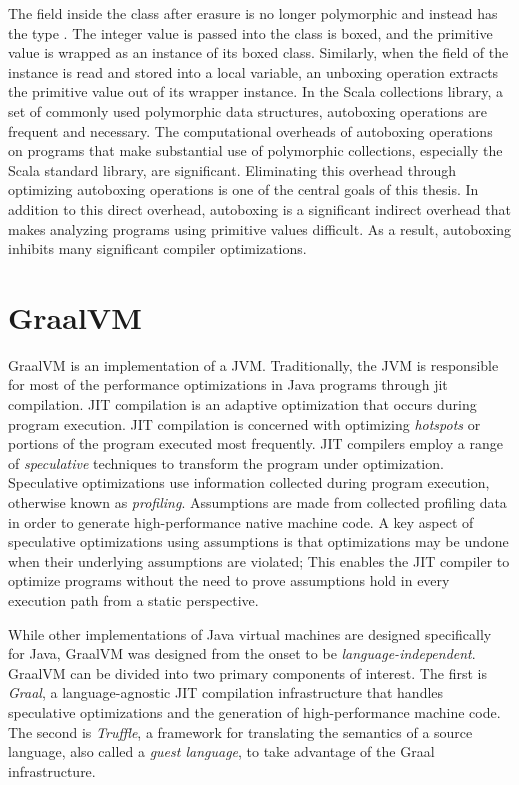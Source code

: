 The  field inside the  class after erasure is no longer polymorphic and instead has the type . 
The integer value  is passed into the  class is boxed, and the primitive value is wrapped as an instance of its boxed class.
Similarly, when the  field of the instance is read and stored into a local variable, an unboxing operation extracts the primitive value out of its wrapper instance.
In the Scala collections library, a set of commonly used polymorphic data structures, autoboxing operations are frequent and necessary.
The computational overheads of autoboxing operations on programs that make substantial use of polymorphic collections, especially the Scala standard library, are significant\cite{scala:collections-optimization}.
Eliminating this overhead through optimizing autoboxing operations is one of the central goals of this thesis.
In addition to this direct overhead, autoboxing is a significant indirect overhead that makes analyzing programs using primitive values difficult. As a result, autoboxing inhibits many significant compiler optimizations.

\section{GraalVM}

GraalVM\cite{java:graalvm} is an implementation of a JVM.
Traditionally, the JVM is responsible for most of the performance optimizations in Java programs\cite{java:hotspot} through \acrfull{jit} compilation.
JIT compilation is an adaptive optimization that occurs during program execution.
JIT compilation is concerned with optimizing \textit{hotspots} or portions of the program executed most frequently.
JIT compilers\cite{java:sablevm,java:jikesrvm} employ a range of \textit{speculative} techniques to transform the program under optimization.
Speculative optimizations use information collected during program execution, otherwise known as \textit{profiling}. 
Assumptions are made from collected profiling data in order to generate high-performance native machine code.
A key aspect of speculative optimizations using assumptions is that optimizations may be undone when their underlying assumptions are violated; This enables the JIT compiler to optimize programs without the need to prove assumptions hold in every execution path from a static perspective.

While other implementations of Java virtual machines are designed specifically for Java, GraalVM was designed from the onset to be \textit{language-independent}.
GraalVM can be divided into two primary components of interest. 
The first is \textit{Graal}, a language-agnostic JIT compilation infrastructure that handles speculative optimizations and the generation of high-performance machine code.
The second is \textit{Truffle}, a framework for translating the semantics of a source language, also called a \textit{guest language}, to take advantage of the Graal infrastructure.

